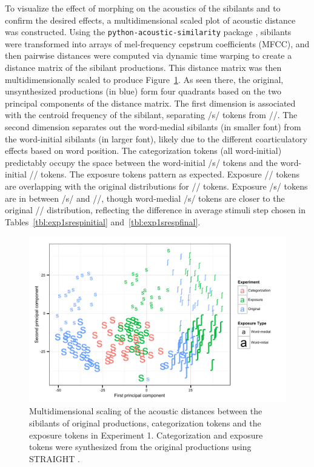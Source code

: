 To visualize the effect of morphing on the acoustics of the sibilants and to confirm the desired effects, a multidimensional scaled plot of acoustic distance was constructed.  
Using the \texttt{python-acoustic-similarity} package \citep{McAuliffe2015}, sibilants were transformed into arrays of mel-frequency cepstrum coefficients (MFCC), and then pairwise distances were computed via dynamic time warping to create a distance matrix of the sibilant productions.  
This distance matrix was then multidimensionally scaled to produce Figure~\ref{fig:exp1mds}.  
As seen there, the original, unsynthesized productions (in blue) form four quadrants based on the two principal components of the distance matrix. 
 The first dimension is associated with the centroid frequency of the sibilant, separating /s/ tokens from /\textesh/.  
The second dimension separates out the word-medial sibilants (in smaller font) from the word-initial sibilants (in larger font), likely due to the different coarticulatory effects based on word position.  
The categorization tokens (all word-initial) predictably occupy the space between the word-initial /s/ tokens and the word-initial /\textesh/ tokens. 
 The exposure tokens pattern as expected.  Exposure /\textesh/ tokens are overlapping with the original distributions for /\textesh/ tokens.  
Exposure /s/ tokens are in between /s/ and /\textesh/, though word-medial /s/ tokens are closer to the original /\textesh/ distribution, reflecting the difference in average stimuli step chosen in Tables~\ref{tbl:exp1srespinitial} and~\ref{tbl:exp1srespfinal}.

\begin{figure}[ht]
\caption{Multidimensional scaling of the acoustic distances between the sibilants of original productions, categorization tokens and the exposure tokens in Experiment 1.  Categorization and exposure tokens were synthesized from the original productions using STRAIGHT \citep{Kawahara2008}.}
\label{fig:exp1mds}
\begin{center}
\includegraphics[width=\textwidth]{graphs/exp1_mds}
\end{center}
\end{figure}

